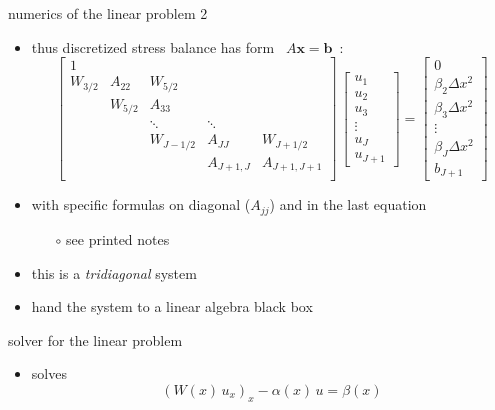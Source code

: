 \begin{frame}{numerics of the linear problem 2}

\small
\begin{itemize}
\item thus discretized stress balance has form  \, $A \mathbf{x} = \mathbf{b}$\, :
$$
\begin{bmatrix}
1 &  &  &  &  \\
W_{3/2} & A_{22} & W_{5/2} &  &  \\
 & W_{5/2} & A_{33} &  &  \\
 &  & \ddots & \ddots &  \\
 &  & W_{J-1/2} & A_{JJ} & W_{J+1/2} \\
 &  &  & A_{J+1,J} & A_{J+1,J+1} \\
\end{bmatrix}\,
\begin{bmatrix}
u_1 \\ u_2 \\ u_3 \\ \vdots \\ u_J \\ u_{J+1}
\end{bmatrix}
=
\begin{bmatrix}
0 \\ \beta_2 \Delta x^2 \\ \beta_3 \Delta x^2 \\ \vdots \\ \beta_J \Delta x^2 \\ b_{J+1}
\end{bmatrix}
$$
\item with specific formulas on diagonal ($A_{jj}$) and in the last equation
  \begin{itemize}
  \small
  \item[$\circ$] see printed notes
  \end{itemize}
\item this is a \emph{tridiagonal} system
\item hand the system to a linear algebra black box
\end{itemize}
\end{frame}


\begin{frame}{solver for the linear problem}


\vspace{-4mm}
\begin{itemize}
\item solves
   $$\left(W(x)\, u_x\right)_x - \alpha(x)\, u = \beta(x)$$
\end{itemize}
\end{frame}


